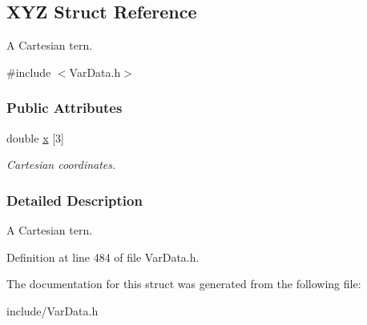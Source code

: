 \hypertarget{structXYZ}{\subsection{\-X\-Y\-Z \-Struct \-Reference}
\label{structXYZ}
}


\-A \-Cartesian tern.  




{\ttfamily \#include $<$\-Var\-Data.\-h$>$}

\subsubsection*{\-Public \-Attributes}
\begin{DoxyCompactItemize}
\item 
\hypertarget{structXYZ_a8639a6dd4fb3c4aa452b708733d827b4}{double \hyperlink{structXYZ_a8639a6dd4fb3c4aa452b708733d827b4}{x} \mbox{[}3\mbox{]}}\label{structXYZ_a8639a6dd4fb3c4aa452b708733d827b4}

\begin{DoxyCompactList}\small\item\em \-Cartesian coordinates. \end{DoxyCompactList}\end{DoxyCompactItemize}


\subsubsection{\-Detailed \-Description}
\-A \-Cartesian tern. 

\-Definition at line 484 of file \-Var\-Data.\-h.



\-The documentation for this struct was generated from the following file\-:\begin{DoxyCompactItemize}
\item 
include/\-Var\-Data.\-h\end{DoxyCompactItemize}
